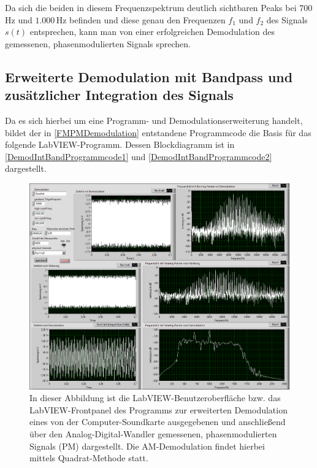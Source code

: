 \documentclass[
a4paper,
12pt,
pagesize,
ngerman
]{scrartcl}
\begin{document}
	\noindent Da sich die beiden in diesem Frequenzspektrum deutlich sichtbaren Peaks bei $700\,$Hz und $1.000\,$Hz befinden und diese genau den Frequenzen $f_1$ und $f_2$ des Signals $s(t)$ entsprechen, kann man von einer erfolgreichen Demodulation des gemessenen, phasenmodulierten Signals sprechen.
	
	
	
	
	\subsection{Erweiterte Demodulation mit Bandpass und zusätzlicher Integration des Signals} %
	
	Da es sich hierbei um eine Programm- und Demodulationserweiterung handelt, bildet der in \cref{FMPMDemodulation} entstandene Programmcode die Basis für das folgende LabVIEW-Programm.
	Dessen Blockdiagramm ist in \cref{DemodIntBandProgrammcode1} und \cref{DemodIntBandProgrammcode2} dargestellt.
	
	\begin{figure}[H]
		\centering
		\includegraphics[width=1.0\textwidth]{EIRE2018Dateien/Tag4/OsziFMPM-Demod/mitBandpassUndIntegrationBilder/OsziPlusFMPMp}
		\caption{In dieser Abbildung ist die LabVIEW-Benutzeroberfläche bzw. das LabVIEW-Frontpanel des Programms zur erweiterten Demodulation eines von der Computer-Soundkarte ausgegebenen und anschließend über den Analog-Digital-Wandler gemessenen, phasenmodulierten Signals (\glqq PM\grqq ) dargestellt. Die AM-Demodulation findet hierbei mittels \glqq Quadrat\grqq -Methode statt.}
		\label{DemodIntBandFrontpanel}
	\end{figure}
	
\end{document}

